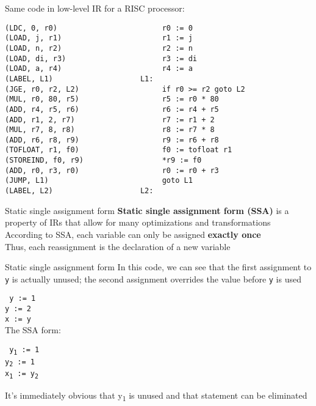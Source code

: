 \documentclass[../index.tex]{subfiles}
\begin{document}
\begin{frame}[fragile]{\currenttitle}
  Same code in low-level IR for a RISC processor: \\[1em]

  \begin{lstlisting}[basicstyle=\ttfamily\scriptsize]
(LDC, 0, r0)                        r0 := 0
(LOAD, j, r1)                       r1 := j
(LOAD, n, r2)                       r2 := n
(LOAD, di, r3)                      r3 := di
(LOAD, a, r4)                       r4 := a
(LABEL, L1)                    L1:
(JGE, r0, r2, L2)                   if r0 >= r2 goto L2
(MUL, r0, 80, r5)                   r5 := r0 * 80
(ADD, r4, r5, r6)                   r6 := r4 + r5
(ADD, r1, 2, r7)                    r7 := r1 + 2
(MUL, r7, 8, r8)                    r8 := r7 * 8
(ADD, r6, r8, r9)                   r9 := r6 + r8
(TOFLOAT, r1, f0)                   f0 := tofloat r1
(STOREIND, f0, r9)                  *r9 := f0
(ADD, r0, r3, r0)                   r0 := r0 + r3
(JUMP, L1)                          goto L1
(LABEL, L2)                    L2:
  \end{lstlisting}
\end{frame}
  
\renewcommand{\currenttitle}{Static single assignment form}
\begin{frame}[fragile]{\currenttitle}
  \textbf{Static single assignment form (SSA)} is a property of IRs that allow
  for many optimizations and transformations \\[1.5em]

  According to SSA, each variable can only be assigned \textbf{exactly once} \\
  Thus, each reassignment is the declaration of a new variable
\end{frame}
  
\begin{frame}[fragile]{\currenttitle}
  In this code, we can see that the first assignment to \texttt{y} is actually
  unused; the second assignment overrides the value before \texttt{y} is used

  \texttt{%
    y := 1 \\
    y := 2 \\
    x := y
  } \\[1em]

  The SSA form:

  \texttt{%
    y\textsubscript{1} := 1 \\
    y\textsubscript{2} := 1 \\
    x\textsubscript{1} := y\textsubscript{2}
  }

  It's immediately obvious that y\textsubscript{1} is unused and that statement
  can be eliminated
\end{frame}
  
\end{document}
